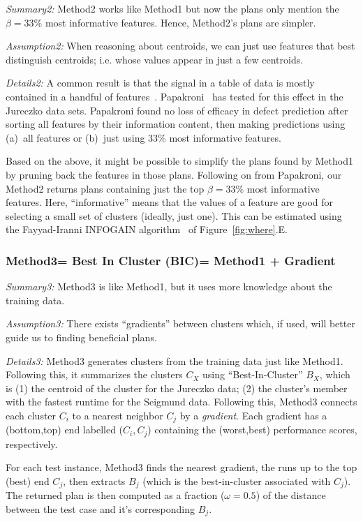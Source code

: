 \documentclass{sig-alternate}
\newcommand{\fig}[1]{Figure~\ref{fig:#1}}
\begin{document}
{\em Summary2:} Method2 works like Method1 but now the   plans  only
mention the $\beta=33\%$ most informative features. Hence, Method2's plans are simpler.

{\em Assumption2: }  When reasoning about centroids, we can
just use features that best distinguish centroids; i.e. whose values appear in just a few centroids.
 

{\em Details2:} A common result is that the signal in a table of data is mostly contained in a handful of features~\cite{hall03,kohavi97}.
Papakroni~\cite{papa13} has tested for this effect in the Jureczko data sets.
Papakroni found no loss of   efficacy in defect prediction after
sorting all features by their information content,
then making predictions using (a)~all  features or (b)~just using   33\% most informative features.

Based on the above, it might be possible to simplify the plans found by Method1  by pruning back the features in those
 plans. Following on from Papakroni, our Method2 returns plans
containing just the top $\beta=33\%$ most informative features. Here, ``informative'' means
that the values of a feature are good for selecting a small set of clusters (ideally,
just one).
This can be estimated using the Fayyad-Iranni INFOGAIN algorithm~\cite{FayIra93Multi}
of \fig{where}.E.
 
 
 
\subsubsection{Method3= Best In Cluster (BIC)=   Method1 + Gradient}\label{sect:BIC}

{\em Summary3:} Method3 is like Method1, but it uses more knowledge about the training data.

{\em Assumption3: } There exists ``gradients'' between clusters which, if used, will better guide us to finding beneficial plans.

{\em Details3:}
Method3 generates clusters from the training data just like Method1. Following this, it summarizes the clusters $C_X$ using ``Best-In-Cluster'' $B_X$, which is (1) the centroid of the cluster for the Jureczko data; (2) the cluster's member with the fastest runtime for the Seigmund data. Following this, Method3 connects  each cluster $C_i$ to a nearest neighbor $C_j$ by a {\em gradient}. Each gradient has a (bottom,top) end labelled  ($C_i,C_j$) containing the (worst,best) performance scores, respectively. 

For each test instance, Method3 finds the nearest gradient, the runs up to the top (best) end $C_j$, then extracts $B_j$ (which is the best-in-cluster associated with  $C_j$). The returned plan is then computed as a fraction ($\omega=0.5$) of the distance between the test case and it's corresponding $B_j$.
 
\end{document}
